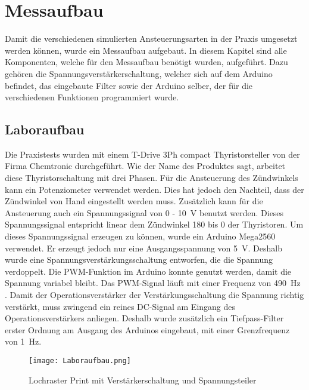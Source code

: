 \section{Messaufbau}
Damit die verschiedenen simulierten Ansteuerungsarten in der Praxis umgesetzt werden können, wurde ein Messaufbau aufgebaut. In diesem Kapitel sind alle Komponenten, welche für den Messaufbau benötigt wurden, aufgeführt. Dazu gehören die Spannungsverstärkerschaltung, welcher sich auf dem Arduino befindet, das eingebaute Filter sowie der Arduino selber, der für die verschiedenen Funktionen programmiert wurde.
\subsection{Laboraufbau}
Die Praxistests wurden mit einem \grqq T-Drive 3Ph compact Thyristorsteller\grqq \hspace{0.02cm} von der Firma Chemtronic durchgeführt. Wie der Name des Produktes sagt, arbeitet diese Thyristorschaltung mit drei Phasen. Für die Ansteuerung des Zündwinkels kann ein Potenziometer verwendet werden. Dies hat jedoch den Nachteil, dass der Zündwinkel von Hand eingestellt werden muss. Zusätzlich kann für die Ansteuerung auch ein Spannungssignal von 0 - \SI{10}{V} benutzt werden. Dieses Spannungssignal entspricht linear dem Zündwinkel 180\textdegree \hspace{0.02cm} bis 0\textdegree \hspace{0.02cm} der Thyristoren. Um dieses Spannungssignal erzeugen zu können, wurde ein Arduino Mega2560 verwendet. Er erzeugt jedoch nur eine Ausgangsspannung von \SI{5}{V}. Deshalb wurde eine Spannungsverstärkungsschaltung entworfen, die die Spannung verdoppelt. Die PWM-Funktion im Arduino konnte genutzt werden, damit die Spannung variabel bleibt. Das PWM-Signal läuft mit einer Frequenz von \SI{490}{Hz} \cite{Arduino_PWM}. 
Damit der Operationsverstärker der Verstärkungsschaltung die Spannung richtig verstärkt, muss zwingend ein reines DC-Signal am Eingang des Operationsverstärkers anliegen. Deshalb wurde zusätzlich ein Tiefpass-Filter erster Ordnung am Ausgang des Arduinos eingebaut, mit einer Grenzfrequenz von \SI{1}{Hz}.  

\begin{figure}[ht!]  
	\centering
	\texttt{[image: Laboraufbau.png]}	
	\caption{Lochraster Print mit Verstärkerschaltung und Spannungsteiler}\label{fig:Laboraufbau}
\end{figure}

